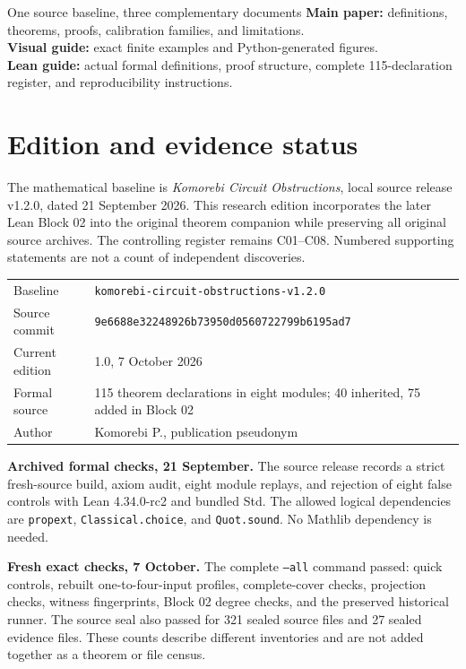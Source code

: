 \documentclass[11pt,letterpaper,oneside]{report}
\theoremstyle{komorebi}
\begin{document}
\begin{scopebox}{One source baseline, three complementary documents}
\textbf{Main paper:} definitions, theorems, proofs, calibration families, and limitations.\\
\textbf{Visual guide:} exact finite examples and Python-generated figures.\\
\textbf{Lean guide:} actual formal definitions, proof structure, complete 115-declaration register, and reproducibility instructions.
\end{scopebox}

\chapter*{Edition and evidence status}
The mathematical baseline is \emph{Komorebi Circuit Obstructions}, local source release v1.2.0, dated 21 September 2026. This research edition incorporates the later Lean Block 02 into the original theorem companion while preserving all original source archives. The controlling register remains C01--C08. Numbered supporting statements are not a count of independent discoveries.

\begin{tabularx}{\textwidth}{@{}>{\RaggedRight\arraybackslash}p{1.5in}X@{}}\toprule
Baseline & \texttt{komorebi-circuit-obstructions-v1.2.0}\\
Source commit & \nolinkurl{9e6688e32248926b73950d0560722799b6195ad7}\\
Current edition & 1.0, 7 October 2026\\
Formal source & 115 theorem declarations in eight modules; 40 inherited, 75 added in Block 02\\
Author & Komorebi P., publication pseudonym\\\bottomrule
\end{tabularx}

\textbf{Archived formal checks, 21 September.} The source release records a strict fresh-source build, axiom audit, eight module replays, and rejection of eight false controls with Lean 4.34.0-rc2 and bundled Std. The allowed logical dependencies are \texttt{propext}, \texttt{Classical.choice}, and \texttt{Quot.sound}. No Mathlib dependency is needed.

\textbf{Fresh exact checks, 7 October.} The complete \texttt{--all} command passed: quick controls, rebuilt one-to-four-input profiles, complete-cover checks, projection checks, witness fingerprints, Block 02 degree checks, and the preserved historical runner. The source seal also passed for 321 sealed source files and 27 sealed evidence files. These counts describe different inventories and are not added together as a theorem or file census.
\end{document}
